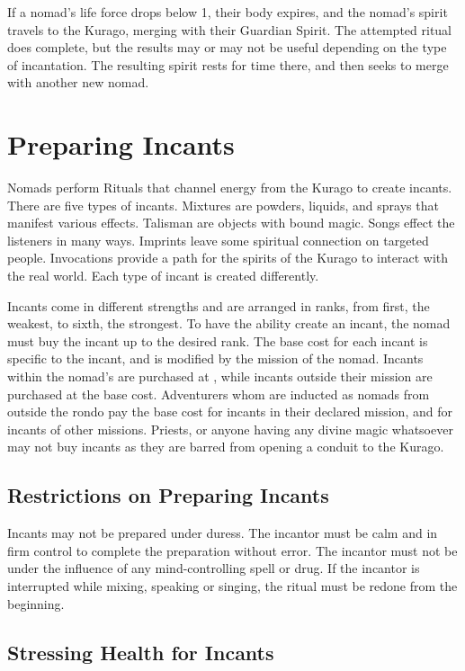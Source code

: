 \begin{multicols*}{2}
If a nomad’s life force drops below 1, their body expires, and the nomad’s spirit travels to the Kurago, merging with their Guardian Spirit. The attempted ritual does complete, but the results may or may not be useful depending on the type of incantation. The resulting spirit rests for time there, and then seeks to merge with another new nomad.

\section{Preparing Incants}

Nomads perform Rituals that channel energy from the Kurago to create incants. There are five types of incants. Mixtures are powders, liquids, and sprays that manifest various effects. Talisman are objects with bound magic. Songs effect the listeners in many ways. Imprints leave some spiritual connection on targeted people. Invocations provide a path for the spirits of the Kurago to interact with the real world. Each type of incant is created differently.

Incants come in different strengths and are arranged in ranks, from first, the weakest, to sixth, the strongest. To have the ability create an incant, the nomad must buy the incant up to the desired rank. The base cost for each incant is specific to the incant, and is modified by the mission of the nomad. Incants within the nomad's  are purchased at , while incants outside their mission are purchased at  the base cost.
Adventurers whom are inducted as nomads from outside the rondo pay  the base cost for incants in their declared mission, and  for incants
of other missions. Priests, or anyone having any divine magic whatsoever may not buy incants as they are barred from opening a conduit to the Kurago.

\subsection{Restrictions on Preparing Incants}

Incants may not be prepared under duress. The incantor must be calm and in firm control to complete the preparation without error. The incantor must not be under the influence of any mind-controlling spell or drug. If the incantor is interrupted while mixing, speaking or singing, the ritual must be redone from the beginning.

\subsection{Stressing Health for Incants}


\end{multicols*}
